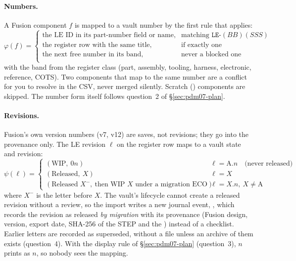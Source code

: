 \paragraph{Numbers.} A Fusion component $f$ is mapped to a vault number by the first rule that applies:
\[
  \varphi(f) =
  \begin{cases}
    \text{the LE ID in its part-number field or name}, & \text{matching } \texttt{LE-}(\mathit{BB})(\mathit{SSS}) \\
    \text{the register row with the same title}, & \text{if exactly one}\\
    \text{the next free number in its band}, & \text{never a blocked one}\\
  \end{cases}
\]
with the band from the register class (part, assembly, tooling, harness, electronic, reference, COTS). Two components
that map to the same number are a conflict for you to resolve in the CSV, never merged silently. Scratch ()
components are skipped. The number form itself follows question~2 of \S\ref{sec:pdm07-plan}.

\paragraph{Revisions.} Fusion's own version numbers (v7, v12) are saves, not revisions; they go into the provenance
only. The LE revision $\ell$ on the register row maps to a vault state and revision:
\[
  \psi(\ell) =
  \begin{cases}
    (\text{WIP},\ 0n) & \ell = \text{A.}n \quad\text{(never released)}\\
    (\text{Released},\ X) & \ell = X\\
    (\text{Released } X^{-},\ \text{then WIP } X \text{ under a migration ECO}) & \ell = X.n,\ X \ne \text{A}
  \end{cases}
\]
where $X^{-}$ is the letter before $X$. The vault's lifecycle cannot create a released revision without a review, so the
import writes a new journal event, , which records the revision as released \emph{by migration}
with its provenance (Fusion design, version, export date, SHA-256 of the STEP and the ) instead of a
checklist. Earlier letters are recorded as superseded, without a file unless an archive of them exists (question~4).
With the display rule of \S\ref{sec:pdm07-plan} (question~3), $n$ prints as $n$, so nobody sees the
mapping.


